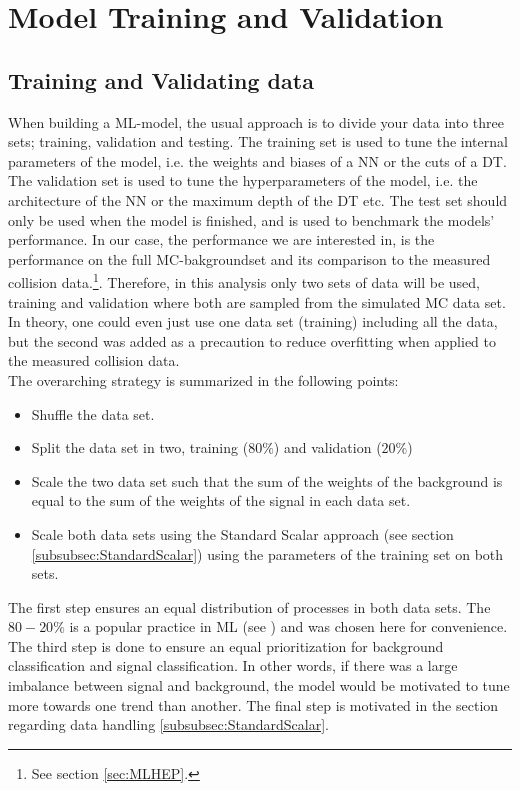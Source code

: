 \section{Model Training and Validation}
\subsection{Training and Validating data}\label{subsec:TraVal}
When building a \ac{ML}-model, the usual approach is to divide your data into three sets; training, validation and 
testing. The training set is used to tune the internal parameters of the model, i.e. the weights and biases of a \ac{NN} or the cuts of a \ac{DT}.
The validation set is used to tune the hyperparameters of the model, i.e. the architecture of the \ac{NN} or the maximum depth of the \ac{DT} etc.
The test set should only be used when the model is finished, and is used to benchmark the models' performance. In our case, the performance we are 
interested in, is the performance on the full \ac{MC}-bakgroundset and its comparison to the measured collision data.\footnote{See section \ref{sec:MLHEP}.}. 
Therefore, in this analysis only two sets of data will be used, training and validation where both are sampled from the simulated
\ac{MC} data set. In theory, one could even just use one data set (training) including all the data, but the second was added as a precaution to reduce 
overfitting when applied to the measured collision data.
\\
The overarching strategy is summarized in the following points:
\begin{itemize}
    \item Shuffle the data set. 
    \item Split the data set in two, training ($80\%$) and validation ($20\%$)
    \item Scale the two data set such that the sum of the weights of the background is equal to the sum of the weights of the signal in each data set.
    \item Scale both data sets using the Standard Scalar approach (see section \ref{subsubsec:StandardScalar}) using the parameters of the training set 
          on both sets.
\end{itemize}
The first step ensures an equal distribution of processes in both data sets. The $80-20\%$ is a popular practice in \ac{ML} (see \cite{8020}) and was chosen 
here for convenience. The third step is done to ensure an equal prioritization for background classification and signal classification. In other words, if there 
was a large imbalance between signal and background, the model would be motivated to tune more towards one trend than another. The final step is motivated in the
section regarding data handling \ref{subsubsec:StandardScalar}. 

